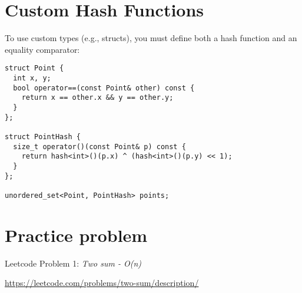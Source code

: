 \documentclass{article}
\begin{document}
\section{Custom Hash Functions}

To use custom types (e.g., structs), you must define both a hash function and an equality comparator:

\begin{lstlisting}[style=cppstyle]
struct Point {
  int x, y;
  bool operator==(const Point& other) const {
    return x == other.x && y == other.y;
  }
};

struct PointHash {
  size_t operator()(const Point& p) const {
    return hash<int>()(p.x) ^ (hash<int>()(p.y) << 1);
  }
};

unordered_set<Point, PointHash> points;
\end{lstlisting}



\section{Practice problem}
Leetcode Problem 1: \textit{Two sum - O(n)}

\url{https://leetcode.com/problems/two-sum/description/}
\end{document}
